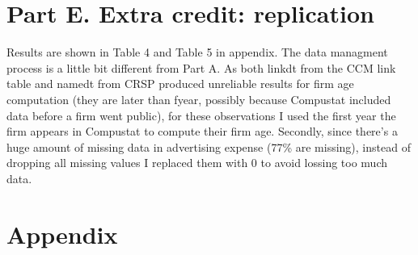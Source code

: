 \documentclass{article}
\begin{document}
\section*{Part E. Extra credit: replication}
Results are shown in Table 4 and Table 5 in appendix. The data managment process is a little bit different from Part A. As both linkdt from the CCM link table and namedt from CRSP produced unreliable results for firm age computation (they are later than fyear, possibly because Compustat included data before a firm went public), for these observations I used the first year the firm appears in Compustat to compute their firm age. Secondly, since there's a huge amount of missing data in advertising expense (77\% are missing), instead of dropping all missing values I replaced them with 0 to avoid lossing too much data.

\section*{Appendix}
\end{document}
